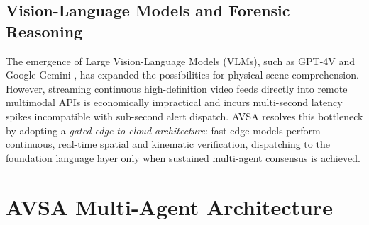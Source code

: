 \documentclass[conference]{IEEEtran}
\begin{document}
\subsection{Vision-Language Models and Forensic Reasoning}
The emergence of Large Vision-Language Models (VLMs), such as GPT-4V and Google Gemini \cite{gemini2023}, has expanded the possibilities for physical scene comprehension. However, streaming continuous high-definition video feeds directly into remote multimodal APIs is economically impractical and incurs multi-second latency spikes incompatible with sub-second alert dispatch. AVSA resolves this bottleneck by adopting a \textit{gated edge-to-cloud architecture}: fast edge models perform continuous, real-time spatial and kinematic verification, dispatching to the foundation language layer only when sustained multi-agent consensus is achieved.

\section{AVSA Multi-Agent Architecture}
\end{document}
